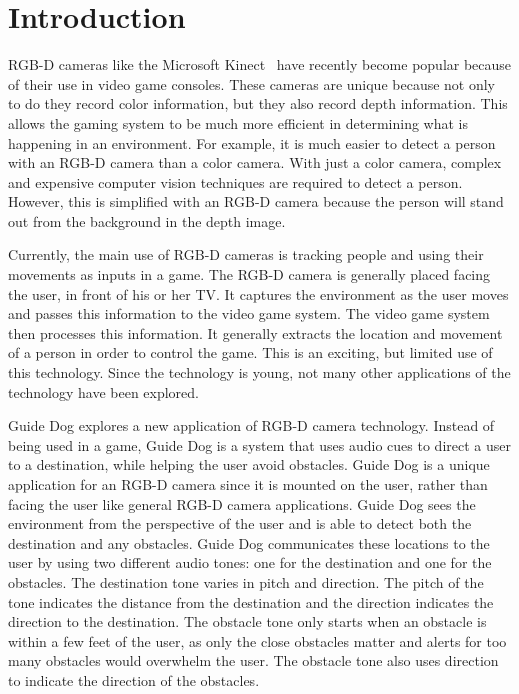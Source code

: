 \section{Introduction}
\label{sec:intro}

RGB-D cameras like the Microsoft Kinect~\cite{kinect-website} have recently
become popular because of their use in video game consoles. These cameras are
unique because not only to do they record color information, but they also record
depth information. This allows the gaming system to be much more efficient in
determining what is happening in an environment. For example, it is much easier
to detect a person with an RGB-D camera than a color camera. With just a color
camera, complex and expensive computer vision techniques are required to detect
a person. However, this is simplified with an RGB-D camera because the person
will stand out from the background in the depth image.

Currently, the main use of RGB-D cameras is tracking people and using their
movements as inputs in a game. The RGB-D camera is generally placed facing the
user, in front of his or her TV. It captures the environment as the user moves
and passes this information to the video game system. The video game system then
processes this information. It generally extracts the location and movement of a
person in order to control the game. This is an exciting, but limited use of
this technology. Since the technology is young, not many other applications of
the technology have been explored.

Guide Dog explores a new application of RGB-D camera technology. Instead of
being used in a game, Guide Dog is a system that uses audio cues to direct a
user to a destination, while helping the user avoid obstacles. Guide Dog is a
unique application for an RGB-D camera since it is mounted on the user, rather
than facing the user like general RGB-D camera applications. Guide Dog sees the
environment from the perspective of the user and is able to detect both the
destination and any obstacles. Guide Dog communicates these locations to the
user by using two different audio tones: one for the destination and one for the
obstacles. The destination tone varies in pitch and direction. The pitch of the
tone indicates the distance from the destination and the direction indicates the
direction to the destination. The obstacle tone only starts when an obstacle is
within a few feet of the user, as only the close obstacles matter and alerts for too many
obstacles would overwhelm the user. The obstacle tone also uses direction to
indicate the direction of the obstacles.

